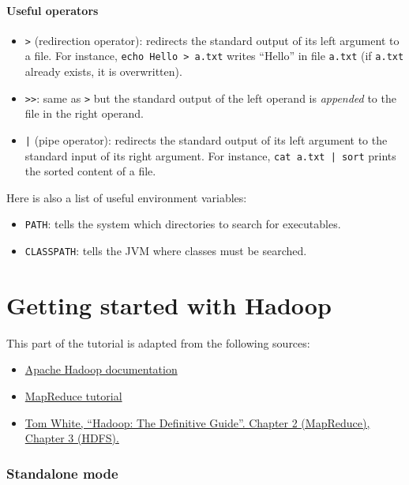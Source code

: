 \documentclass[11pt]{article}
\begin{document}
\subsection{Useful operators}
\begin{itemize}
  \item \texttt{>} (redirection operator): redirects the standard
    output of its left argument to a file. For instance, \texttt{echo
      Hello > a.txt} writes ``Hello'' in file \texttt{a.txt} (if
    \texttt{a.txt} already exists, it is overwritten).
    \item \texttt{>>}: same as \texttt{>} but the standard output of
      the left operand is \emph{appended} to the file in the right operand.
  \item \texttt{|} (pipe operator): redirects the standard output of
    its left argument to the standard input of its right argument. For
    instance, \texttt{cat a.txt | sort} prints the sorted content of a
    file.
\end{itemize}
Here is also a list of useful environment variables:
\begin{itemize}
  \item \texttt{PATH}: tells the system which directories to search for executables.
  \item \texttt{CLASSPATH}: tells the JVM where classes must be searched.
\end{itemize}

\newpage

\part{Getting started with Hadoop}

This part of the tutorial is adapted from the following sources:
\begin{itemize}
\item \href{http://hadoop.apache.org/docs/r2.7.3/index.html}{Apache Hadoop documentation}
\item \href{http://hadoop.apache.org/docs/r2.7.3/hadoop-mapreduce-client/hadoop-mapreduce-client-core/MapReduceTutorial.html}{MapReduce tutorial}
\item \href{http://hadoopbook.com}{Tom White, ``Hadoop: The Definitive Guide''. Chapter 2 (MapReduce), Chapter 3 (HDFS).}
\end{itemize}

\section{Standalone mode}
\end{document}
